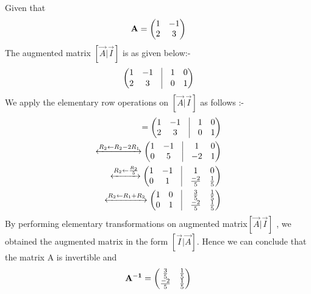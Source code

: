 
   Given that
    \begin{align}
    \mathbf{A} = \begin{pmatrix} 1 & -1 \\ 2 & 3\end{pmatrix}
    \end{align}
    The augmented matrix $ [\vec{A} | \vec{I}]$ is as given below:- 
    \begin{align}
	    \myvec{1 & -1 & \vrule & 1 & 0 \\[1 pt]  2 & 3 & \vrule & 0 & 1}
    \end{align}
    We apply the elementary row operations on $ [\vec{A} | \vec{I}]$ as follows :-
    \begin{align}
    [\vec{A} | \vec{I}] = \myvec{1 & -1 & \vrule & 1 & 0 \\ 2 & 3 & \vrule & 0 & 1}
    \\
    \xleftrightarrow{R_2\leftarrow R_2-2R_1}   
    \myvec{1 & -1 & \vrule & 1 & 0 \\ 0 & 5 & \vrule & -2 & 1}
    \\
    \xleftrightarrow{R_2\leftarrow \frac{R_2}{5}}
    \myvec{1 & -1 & \vrule & 1 & 0 \\ 0 & 1 & \vrule & \frac {-2}{5} & \frac {1}{5}}
    \\
    \xleftrightarrow{R_2\leftarrow R_1+R_2}
    \myvec{1 & 0 & \vrule & \frac{3}{5} & \frac{1}{5}  \\ 0 & 1 & \vrule & \frac{-2}{5} & \frac{1}{5}}
    \end{align}
    By performing elementary transformations on augmented matrix$ [\vec{A} | \vec{I}]$ , we obtained the augmented matrix in the form $ [\vec{I} | \vec{A}]$. 
    Hence we can conclude that the matrix A is invertible and 
    \begin{align}
   \mathbf{A^{-1}}=\begin{pmatrix} \frac{3}{5} & \frac{1}{5}  \\  \frac{-2}{5} & \frac{1}{5}\end{pmatrix} 
    \end{align}
